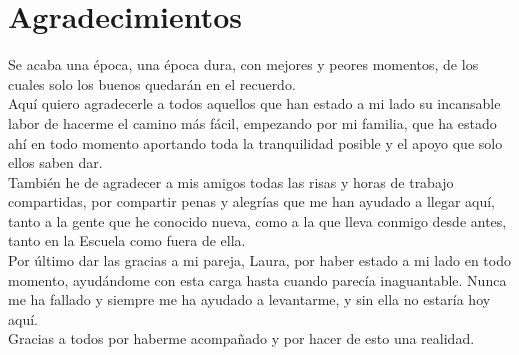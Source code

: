 \thispagestyle{empty}

\chapter*{Agradecimientos}

Se acaba una época, una época dura, con mejores y peores momentos, de los cuales solo los buenos quedarán en el recuerdo.\\

Aquí quiero agradecerle a todos aquellos que han estado a mi lado su incansable labor de hacerme el camino más fácil, empezando por mi familia, que ha estado ahí en todo momento aportando toda la tranquilidad posible y el apoyo que solo ellos saben dar.\\

También he de agradecer a mis amigos todas las risas y horas de trabajo compartidas, por compartir penas y alegrías que me han ayudado a llegar aquí, tanto a la gente que he conocido nueva, como a la que lleva conmigo desde antes, tanto en la Escuela como fuera de ella.\\

Por último dar las gracias a mi pareja, Laura, por haber estado a mi lado en todo momento, ayudándome con esta carga hasta cuando parecía inaguantable. Nunca me ha fallado y siempre me ha ayudado a levantarme, y sin ella no estaría hoy aquí.\\

Gracias a todos por haberme acompañado y por hacer de esto una realidad.

\thispagestyle{empty}

\thispagestyle{empty}